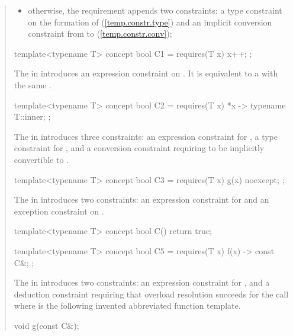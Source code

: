 \begin{quote}
\begin{itemize}
\begin{itemize}
\item otherwise, the requirement appends two constraints:
a type constraint on the formation of  (\ref{temp.constr.type}) and
an implicit conversion constraint from  to 
(\ref{temp.constr.conv});
\end{itemize}
\end{itemize}
%
\enterexample
\begin{codeblock}
template<typename T> concept bool C1 =
  requires(T x) {
    {x++};
  };
\end{codeblock}
The  in  
introduces an expression constraint on .
It is equivalent to a 
with the same .

\begin{codeblock}
template<typename T> concept bool C2 =
  requires(T x) {
    {*x} -> typename T::inner;
  };
\end{codeblock}

The  in  
introduces three constraints: an expression constraint for , 
a type constraint for , and a conversion 
constraint requiring  to be implicitly convertible to
.

\begin{codeblock}
template<typename T> concept bool C3 =
  requires(T x) {
    {g(x)} noexcept;
  };
\end{codeblock}

The  in  
introduces two constraints: an expression constraint for  
and an exception constraint on .

\begin{codeblock}
template<typename T> concept bool C() { return true; }

template<typename T> concept bool C5 =
  requires(T x) {
    {f(x)} -> const C&;
  };
\end{codeblock}

The  in  
introduces two constraints: an expression constraint for , 
and a deduction constraint requiring that overload resolution succeeds for the
call  where  is the following
invented abbreviated function template.
\begin{codeblock}
void g(const C&);
\end{codeblock}
\exitexample


\end{quote}

